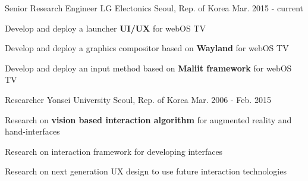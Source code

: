 


\begin{cventries}

  \cventry
    {Senior Research Engineer} %
    {LG Electonics} %
    {Seoul, Rep. of Korea} %
    {Mar. 2015 - current} %
    {
      \begin{cvitems} %
        \item {Develop and deploy a launcher \textbf{UI/UX} for webOS TV}
        \item {Develop and deploy a graphics compositor based on \textbf{Wayland} for webOS TV}
        \item {Develop and deploy an input method based on \textbf{Maliit framework} for webOS TV}
      \end{cvitems}
    }


  \cventry
    {Researcher} %
    {Yonsei University} %
    {Seoul, Rep. of Korea} %
    {Mar. 2006 - Feb. 2015} %
    {
      \begin{cvitems} %
        \item {Research on \textbf{vision based interaction algorithm} for augmented reality and hand-interfaces}
        \item {Research on interaction framework for developing interfaces}
        \item {Research on next generation UX design to use future interaction technologies}
      \end{cvitems}
    }

\end{cventries}
